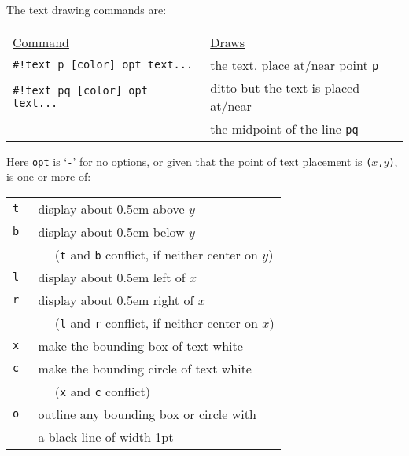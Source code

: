 \documentclass[12pt]{article}
\begin{document}
\begin{minipage}{\textwidth}
The text drawing commands are:
\\[1ex]
\begin{tabular}{@{}l@{~~~~~}l@{}}
\underline{Command} & \underline{Draws}
\\[1ex]
\tt \#!text p [color] opt text... &
    the text, place at/near point {\tt p} \\
\tt \#!text pq [color] opt text... &
    ditto but the text is placed at/near \\
    & the midpoint of the line {\tt pq}
\end{tabular}
\end{minipage}

\begin{minipage}{\textwidth}
Here {\tt opt} is `{\tt -}' for no options, or given that the point
of text placement is {\tt ($x$,$y$)}, is one or more of:
\\[1ex]
\hspace*{0.5in}\begin{tabular}{rl}
    \tt t & display about 0.5em above $y$ \\
    \tt b & display about 0.5em below $y$ \\
          & ~~ ({\tt t} and {\tt b} conflict, if neither center on $y$) \\
    \tt l & display about 0.5em left of $x$ \\
    \tt r & display about 0.5em right of $x$ \\
          & ~~ ({\tt l} and {\tt r} conflict, if neither center on $x$) \\
    \tt x & make the bounding box of text white \\
    \tt c & make the bounding circle of text white \\
          & ~~ ({\tt x} and {\tt c} conflict) \\
    \tt o & outline any bounding box or circle with \\
          & a black line of width 1pt \\
    \end{tabular}
\end{minipage}
\end{document}
